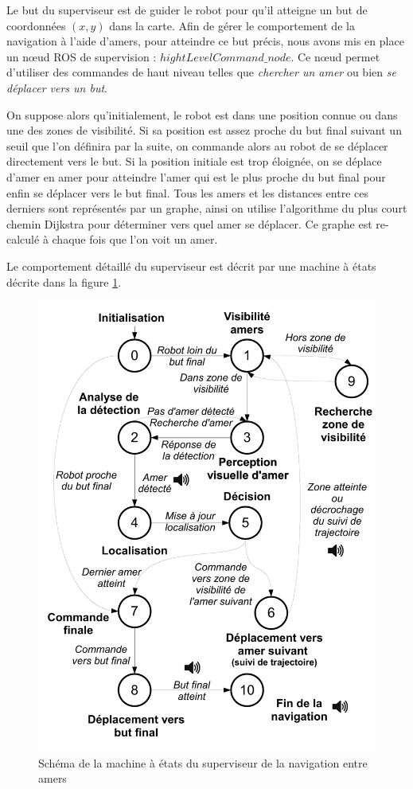 \documentclass[10pt,a4paper]{article}
\begin{document}
Le but du superviseur est de guider le robot pour qu'il atteigne un but de coordonnées $(x,y)$ dans la carte. Afin de gérer le comportement de la navigation à l'aide d'amers, pour atteindre ce but précis, nous avons mis en place un nœud ROS de supervision : $hightLevelCommand\_node$. Ce nœud permet d'utiliser des commandes de haut niveau telles que \textit{chercher un amer} ou bien \textit{se déplacer vers un but}.

On suppose alors qu'initialement, le robot est dans une position connue ou dans une des zones de visibilité. Si sa position est assez proche du but final suivant un seuil que l'on définira par la suite, on commande alors au robot de se déplacer directement vers le but. Si la position initiale est trop éloignée, on se déplace d'amer en amer pour atteindre l'amer qui est le plus proche du but final pour enfin se déplacer vers le but final. Tous les amers et les distances entre ces derniers sont représentés par un graphe, ainsi on utilise l'algorithme du plus court chemin Dijkstra pour déterminer vers quel amer se déplacer. Ce graphe est re-calculé à chaque fois que l'on voit un amer.

Le comportement détaillé du superviseur est décrit par une machine à états décrite dans la figure \ref{HLC_MEF}.



\begin{figure}[!h]
\centering\includegraphics[scale=0.5]{figures/HLC_MEF.pdf}
\caption{Schéma de la machine à états du superviseur de la navigation entre amers}
\label{HLC_MEF}
\end{figure}
\end{document}
